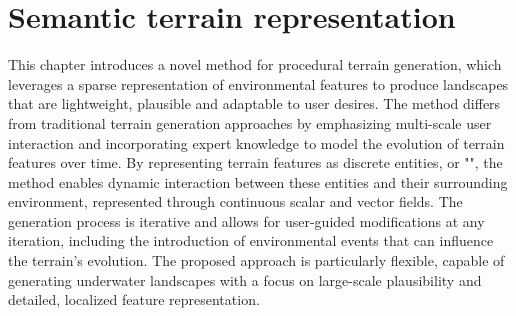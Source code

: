 \graphicspath{ {./Chapter 2/figures/} {./Chapter 2/figures/Snake/} {./Chapter 2/figures/Water/} {./Chapter 2/results/} }

\chapter{Semantic terrain representation}
\label{chap:semantic-representation}
\abstract
\label{chap:env-obj-abstract}
This chapter introduces a novel method for procedural terrain generation, which leverages a sparse representation of environmental features to produce landscapes that are lightweight, plausible and adaptable to user desires. The method differs from traditional terrain generation approaches by emphasizing multi-scale user interaction and incorporating expert knowledge to model the evolution of terrain features over time. By representing terrain features as discrete entities, or "", the method enables dynamic interaction between these entities and their surrounding environment, represented through continuous scalar and vector fields. The generation process is iterative and allows for user-guided modifications at any iteration, including the introduction of environmental events that can influence the terrain's evolution. The proposed approach is particularly flexible, capable of generating underwater landscapes with a focus on large-scale plausibility and detailed, localized feature representation. 
\pagebreak 

\minitoc

